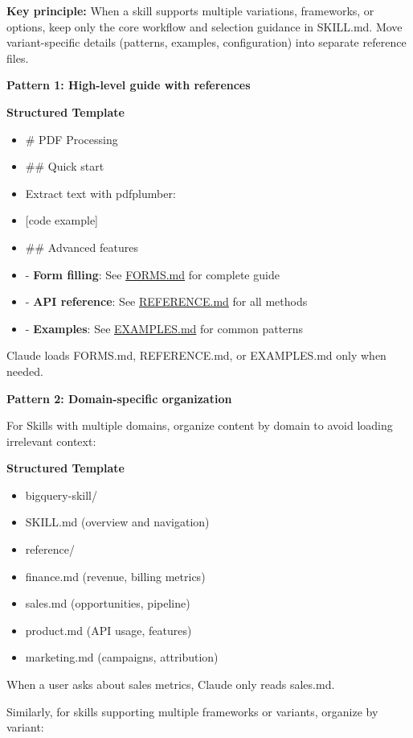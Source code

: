 \documentclass[11pt]{article}
\begin{document}
\textbf{Key principle:} When a skill supports multiple variations, frameworks, or options, keep only the core workflow and selection guidance in SKILL.md. Move variant-specific details (patterns, examples, configuration) into separate reference files.


\textbf{Pattern 1: High-level guide with references}


\textbf{Structured Template}
\begin{itemize}[leftmargin=*,itemsep=2pt,topsep=2pt]
\item {} \# PDF Processing
\item {} \#\# Quick start
\item {} Extract text with pdfplumber:
\item {} [code example]
\item {} \#\# Advanced features
\item {} - \textbf{Form filling}: See \href{FORMS.md}{FORMS.md} for complete guide
\item {} - \textbf{API reference}: See \href{REFERENCE.md}{REFERENCE.md} for all methods
\item {} - \textbf{Examples}: See \href{EXAMPLES.md}{EXAMPLES.md} for common patterns
\end{itemize}

Claude loads FORMS.md, REFERENCE.md, or EXAMPLES.md only when needed.


\textbf{Pattern 2: Domain-specific organization}


For Skills with multiple domains, organize content by domain to avoid loading irrelevant context:


\textbf{Structured Template}
\begin{itemize}[leftmargin=*,itemsep=2pt,topsep=2pt]
\item {} bigquery-skill/
\item {} SKILL.md (overview and navigation)
\item {} reference/
\item {} finance.md (revenue, billing metrics)
\item {} sales.md (opportunities, pipeline)
\item {} product.md (API usage, features)
\item {} marketing.md (campaigns, attribution)
\end{itemize}

When a user asks about sales metrics, Claude only reads sales.md.


Similarly, for skills supporting multiple frameworks or variants, organize by variant:
\end{document}

